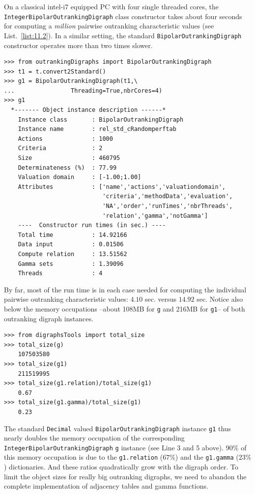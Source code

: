 On a classical intel-i7 equipped PC with four single threaded cores, the \texttt{Inte\-ger\-BipolarOutrankingDigraph} class constructor takes about four seconds for computing a \emph{million} pairwise outranking characteristic values (see List.~\vref{list:11.2}). In a similar setting, the standard \texttt{BipolarOutranking\-Digraph} constructor operates more than two times slower.
\begin{lstlisting}
>>> from outrankingDigraphs import BipolarOutrankingDigraph
>>> t1 = t.convert2Standard()
>>> g1 = BipolarOutrankingDigraph(t1,\
...                Threading=True,nbrCores=4)
>>> g1
  *------- Object instance description ------*
    Instance class       : BipolarOutrankingDigraph
    Instance name        : rel_std_cRandomperftab
    Actions              : 1000
    Criteria             : 2
    Size                 : 460795
    Determinateness (%)  : 77.99
    Valuation domain     : [-1.00;1.00]
    Attributes           : ['name','actions','valuationdomain',
                            'criteria','methodData','evaluation',
                            'NA','order','runTimes','nbrThreads',
                            'relation','gamma','notGamma']
    ----  Constructor run times (in sec.) ----
    Total time           : 14.92166
    Data input           : 0.01506
    Compute relation     : 13.51562
    Gamma sets           : 1.39096
    Threads              : 4
\end{lstlisting}

By far, most of the run time is in each case needed for computing the individual pairwise outranking characteristic values: $4.10$ sec. versus $14.92$ sec. Notice also below the memory occupations --about 108MB for \texttt{g} and 216MB for \texttt{g1}-- of both outranking digraph instances.
\begin{lstlisting}
>>> from digraphsTools import total_size
>>> total_size(g)
    107503580
>>> total_size(g1)
    211519995
>>> total_size(g1.relation)/total_size(g1)
    0.67
>>> total_size(g1.gamma)/total_size(g1)
    0.23
\end{lstlisting}

The standard \texttt{Decimal} valued \texttt{BipolarOutrankingDigraph} instance \texttt{g1} thus nearly doubles the memory occupation of the corresponding \texttt{IntegerBipo\-larOutrankingDigraph} \texttt{g} instance (see Line 3 and 5 above). $90\%$ of this memory occupation is due to the \texttt{g1.relation} ($67\%$) and the \texttt{g1.gamma} ($23\%$) dictionaries. And these ratios quadratically grow with the digraph order. To limit the object sizes for really big outranking digraphs, we need to abandon the complete implementation of adjacency tables and gamma functions.


